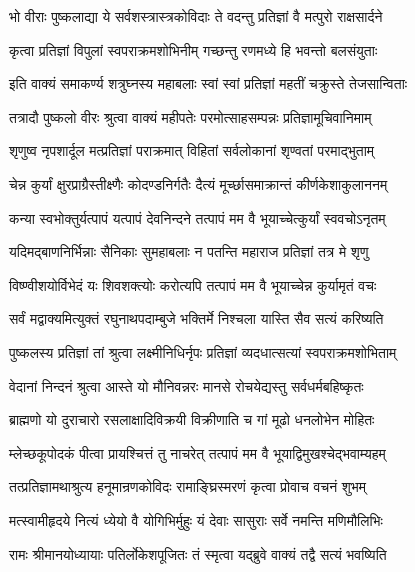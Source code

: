 \twolineshloka
{भो वीराः पुष्कलाद्या ये सर्वशस्त्रास्त्रकोविदाः}
{ते वदन्तु प्रतिज्ञां वै मत्पुरो राक्षसार्दने}%

\twolineshloka
{कृत्वा प्रतिज्ञां विपुलां स्वपराक्रमशोभिनीम्}
{गच्छन्तु रणमध्ये हि भवन्तो बलसंयुताः}%

\twolineshloka
{इति वाक्यं समाकर्ण्य शत्रुघ्नस्य महाबलाः}
{स्वां स्वां प्रतिज्ञां महतीं चक्रुस्ते तेजसान्विताः}%

\twolineshloka
{तत्रादौ पुष्कलो वीरः श्रुत्वा वाक्यं महीपतेः}
{परमोत्साहसम्पन्नः प्रतिज्ञामूचिवानिमाम्}%


\twolineshloka
{शृणुष्व नृपशार्दूल मत्प्रतिज्ञां पराक्रमात्}
{विहितां सर्वलोकानां शृण्वतां परमाद्भुताम्}%

\twolineshloka
{चेन्न कुर्यां क्षुरप्राग्रैस्तीक्ष्णैः कोदण्डनिर्गतैः}
{दैत्यं मूर्च्छासमाक्रान्तं कीर्णकेशाकुलाननम्}%

\twolineshloka
{कन्या स्वभोक्तुर्यत्पापं यत्पापं देवनिन्दने}
{तत्पापं मम वै भूयाच्चेत्कुर्यां स्ववचोऽनृतम्}%

\twolineshloka
{यदिमद्बाणनिर्भिन्नाः सैनिकाः सुमहाबलाः}
{न पतन्ति महाराज प्रतिज्ञां तत्र मे शृणु}%

\twolineshloka
{विष्ण्वीशयोर्विभेदं यः शिवशक्त्योः करोत्यपि}
{तत्पापं मम वै भूयाच्चेन्न कुर्यामृतं वचः}%

\twolineshloka
{सर्वं मद्वाक्यमित्युक्तं रघुनाथपदाम्बुजे}
{भक्तिर्मे निश्चला यास्ति सैव सत्यं करिष्यति}%

\twolineshloka
{पुष्कलस्य प्रतिज्ञां तां श्रुत्वा लक्ष्मीनिधिर्नृपः}
{प्रतिज्ञां व्यदधात्सत्यां स्वपराक्रमशोभिताम्}%


\twolineshloka
{वेदानां निन्दनं श्रुत्वा आस्ते यो मौनिवन्नरः}
{मानसे रोचयेद्यस्तु सर्वधर्मबहिष्कृतः}%

\twolineshloka
{ब्राह्मणो यो दुराचारो रसलाक्षादिविक्रयी}
{विक्रीणाति च गां मूढो धनलोभेन मोहितः}%

\twolineshloka
{म्लेच्छकूपोदकं पीत्वा प्रायश्चित्तं तु नाचरेत्}
{तत्पापं मम वै भूयाद्विमुखश्चेद्भवाम्यहम्}%

\twolineshloka
{तत्प्रतिज्ञामथाश्रुत्य हनूमान्रणकोविदः}
{रामाङ्घ्रिस्मरणं कृत्वा प्रोवाच वचनं शुभम्}%

\twolineshloka
{मत्स्वामीहृदये नित्यं ध्येयो वै योगिभिर्मुहुः}
{यं देवाः सासुराः सर्वे नमन्ति मणिमौलिभिः}%

\twolineshloka
{रामः श्रीमानयोध्यायाः पतिर्लोकेशपूजितः}
{तं स्मृत्वा यद्ब्रुवे वाक्यं तद्वै सत्यं भवष्यिति}%

